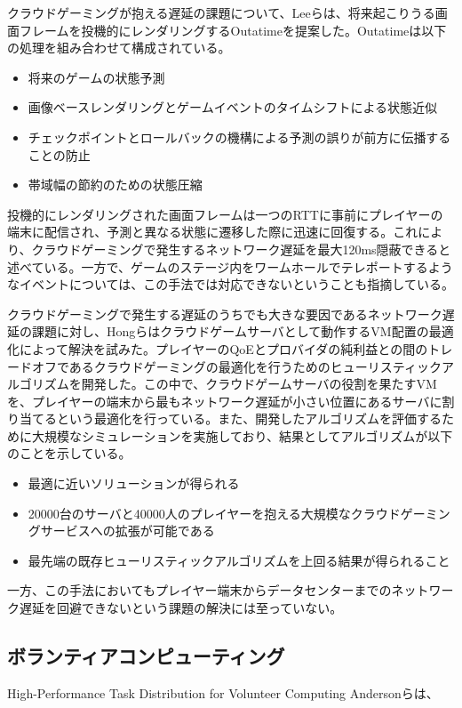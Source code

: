 クラウドゲーミングが抱える遅延の課題について、Leeら\cite{outatime}は、将来起こりうる画面フレームを投機的にレンダリングするOutatimeを提案した。Outatimeは以下の処理を組み合わせて構成されている。
\begin{itemize}
    \item 将来のゲームの状態予測
    \item 画像ベースレンダリングとゲームイベントのタイムシフトによる状態近似
    \item チェックポイントとロールバックの機構による予測の誤りが前方に伝播することの防止
    \item 帯域幅の節約のための状態圧縮
\end{itemize}
投機的にレンダリングされた画面フレームは一つのRTTに事前にプレイヤーの端末に配信され、予測と異なる状態に遷移した際に迅速に回復する。これにより、クラウドゲーミングで発生するネットワーク遅延を最大120ms隠蔽できると述べている。一方で、ゲームのステージ内をワームホールでテレポートするようなイベントについては、この手法では対応できないということも指摘している。

クラウドゲーミングで発生する遅延のうちでも大きな要因であるネットワーク遅延の課題に対し、Hongら\cite{placing}はクラウドゲームサーバとして動作するVM配置の最適化によって解決を試みた。プレイヤーのQoEとプロバイダの純利益との間のトレードオフであるクラウドゲーミングの最適化を行うためのヒューリスティックアルゴリズムを開発した。この中で、クラウドゲームサーバの役割を果たすVMを、プレイヤーの端末から最もネットワーク遅延が小さい位置にあるサーバに割り当てるという最適化を行っている。また、開発したアルゴリズムを評価するために大規模なシミュレーションを実施しており、結果としてアルゴリズムが以下のことを示している。
\begin{itemize}
    \item 最適に近いソリューションが得られる
    \item 20000台のサーバと40000人のプレイヤーを抱える大規模なクラウドゲーミングサービスへの拡張が可能である
    \item 最先端の既存ヒューリスティックアルゴリズムを上回る結果が得られること
\end{itemize}
一方、この手法においてもプレイヤー端末からデータセンターまでのネットワーク遅延を回避できないという課題の解決には至っていない。



\subsection{ボランティアコンピューティング}
High-Performance Task Distribution for Volunteer Computing 
Andersonら\cite{boinc}は、


